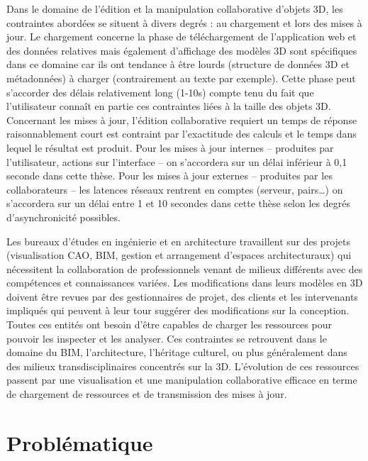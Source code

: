 Dans le domaine de l'édition et la manipulation collaborative 
d'objets 3D, les contraintes abordées se situent à divers degrés : au chargement 
et lors des mises à jour. Le chargement concerne la phase de téléchargement de 
l'application web et des données relatives mais également d'affichage des 
modèles 3D sont spécifiques dans ce domaine car ils ont 
tendance à être lourds (structure de données 3D et métadonnées) à charger 
(contrairement au texte par exemple). Cette phase peut s'accorder des délais 
relativement long (1-10s) compte tenu du fait que l'utilisateur connaît en partie ces 
contraintes liées à la taille des objets 3D. Concernant les mises à jour, l'édition 
collaborative requiert un temps de réponse raisonnablement court est contraint par 
l'exactitude des calculs et le temps dans lequel le résultat est produit. Pour les 
mises à jour internes -- produites par l'utilisateur, actions sur l'interface -- on 
s'accordera sur un délai inférieur à 0,1 seconde dans cette thèse. 
Pour les mises à jour externes -- produites par les collaborateurs -- les latences 
réseaux rentrent en comptes (serveur, pairs\ldots) on s'accordera sur un délai 
entre 1 et 10 secondes dans cette thèse selon les degrés d'asynchronicité 
possibles. 



Les bureaux d'études en ingénierie et en architecture travaillent sur des projets 
(visualisation \gls{CAO}, \gls{BIM}, gestion et arrangement d'espaces 
architecturaux) qui 
nécessitent la collaboration de professionnels venant de milieux différents avec 
des compétences et connaissances variées. Les modifications dans leurs 
modèles en \gls{3D} doivent être revues par des gestionnaires de projet, des 
clients et les intervenants impliqués qui peuvent à leur tour suggérer des 
modifications sur la conception. Toutes ces entités ont besoin d'être capables de 
charger les ressources pour pouvoir les inspecter et les analyser. Ces contraintes 
se retrouvent dans le domaine du \gls{BIM}, l'architecture, l'héritage culturel, ou 
plus généralement dans des milieux transdisciplinaires concentrés sur la \gls{3D}. 
L'évolution de ces ressources passent par une visualisation et une manipulation 
collaborative efficace en terme de chargement de ressources et de transmission 
des mises à jour.




\section{Problématique}




